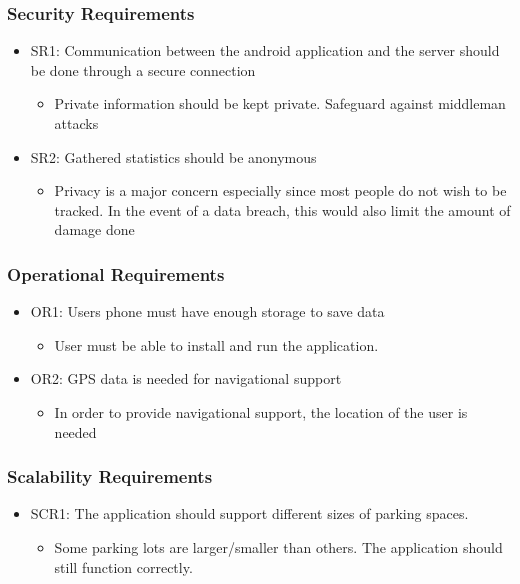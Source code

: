 \documentclass[]{article}
\begin{document}
\subsubsection{Security Requirements}
\begin{itemize}
	\item SR1: Communication between the android application and the server should be done through a secure connection
	\begin{itemize}
		\item Private information should be kept private. Safeguard against middleman attacks
	\end{itemize}
	
	\item SR2: Gathered statistics should be anonymous
	\begin{itemize}
		\item Privacy is a major concern especially since most people do not wish to be tracked. In the event of a data breach, this would also limit the amount of damage done
	\end{itemize}
		
\end{itemize}
\subsubsection{Operational Requirements}
\begin{itemize}
	\item OR1: Users phone must have enough storage to save data
	\begin{itemize}
		\item User must be able to install and run the application.
	\end{itemize}
	
	\item OR2: GPS data is needed for navigational support
	\begin{itemize}
		\item In order to provide navigational support, the location of the user is needed
	\end{itemize}
	
\end{itemize}

\subsubsection{Scalability Requirements}
\begin{itemize}
	\item SCR1: The application should support different sizes of parking spaces.
	\begin{itemize}
		\item Some parking lots are larger/smaller than others. The application should still function correctly.
	\end{itemize}
\end{itemize}
\end{document}
